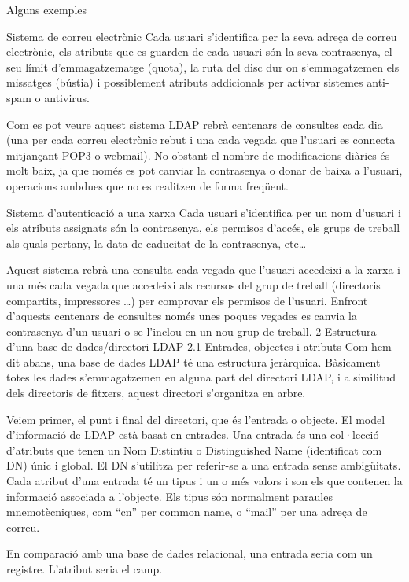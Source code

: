 \documentclass[
  12 pt,
  a4paper,
]{article}
\begin{document}
Alguns exemples

Sistema de correu electrònic Cada usuari s'identifica per la seva adreça
de correu electrònic, els atributs que es guarden de cada usuari són la
seva contrasenya, el seu límit d'emmagatzematge (quota), la ruta del
disc dur on s'emmagatzemen els missatges (bústia) i possiblement
atributs addicionals per activar sistemes anti-spam o antivirus.

Com es pot veure aquest sistema LDAP rebrà centenars de consultes cada
dia (una per cada correu electrònic rebut i una cada vegada que l'usuari
es connecta mitjançant POP3 o webmail). No obstant el nombre de
modificacions diàries és molt baix, ja que només es pot canviar la
contrasenya o donar de baixa a l'usuari, operacions ambdues que no es
realitzen de forma freqüent.

Sistema d'autenticació a una xarxa Cada usuari s'identifica per un nom
d'usuari i els atributs assignats són la contrasenya, els permisos
d'accés, els grups de treball als quals pertany, la data de caducitat de
la contrasenya, etc\ldots{}

Aquest sistema rebrà una consulta cada vegada que l'usuari accedeixi a
la xarxa i una més cada vegada que accedeixi als recursos del grup de
treball (directoris compartits, impressores \ldots) per comprovar els
permisos de l'usuari. Enfront d'aquests centenars de consultes només
unes poques vegades es canvia la contrasenya d'un usuari o se l'inclou
en un nou grup de treball. 2 Estructura d'una base de dades/directori
LDAP 2.1 Entrades, objectes i atributs Com hem dit abans, una base de
dades LDAP té una estructura jeràrquica. Bàsicament totes les dades
s'emmagatzemen en alguna part del directori LDAP, i a similitud dels
directoris de fitxers, aquest directori s'organitza en arbre.

Veiem primer, el punt i final del directori, que és l'entrada o objecte.
El model d'informació de LDAP està basat en entrades. Una entrada és una
col·lecció d'atributs que tenen un Nom Distintiu o Distinguished Name
(identificat com DN) únic i global. El DN s'utilitza per referir-se a
una entrada sense ambigüitats. Cada atribut d'una entrada té un tipus i
un o més valors i son els que contenen la informació associada a
l'objecte. Els tipus són normalment paraules mnemotècniques, com ``cn''
per common name, o ``mail'' per una adreça de correu.

En comparació amb una base de dades relacional, una entrada seria com un
registre. L'atribut seria el camp.
\end{document}
